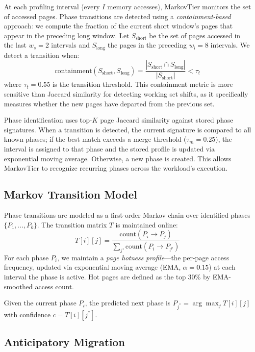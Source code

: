 \documentclass[preprint]{article}
\begin{document}
At each profiling interval (every $I$ memory accesses), MarkovTier monitors the set of accessed pages. Phase transitions are detected using a \emph{containment-based} approach: we compute the fraction of the current short window's pages that appear in the preceding long window. Let $S_\text{short}$ be the set of pages accessed in the last $w_s = 2$ intervals and $S_\text{long}$ the pages in the preceding $w_l = 8$ intervals. We detect a transition when:
\begin{equation}
    \text{containment}(S_\text{short}, S_\text{long}) = \frac{|S_\text{short} \cap S_\text{long}|}{|S_\text{short}|} < \tau_t
\end{equation}
where $\tau_t = 0.55$ is the transition threshold. This containment metric is more sensitive than Jaccard similarity for detecting working set shifts, as it specifically measures whether the new pages have departed from the previous set.

Phase identification uses top-$K$ page Jaccard similarity against stored phase signatures. When a transition is detected, the current signature is compared to all known phases; if the best match exceeds a merge threshold ($\tau_m = 0.25$), the interval is assigned to that phase and the stored profile is updated via exponential moving average. Otherwise, a new phase is created. This allows MarkovTier to recognize recurring phases across the workload's execution.

\subsection{Markov Transition Model}
\label{sec:markov}

Phase transitions are modeled as a first-order Markov chain over identified phases $\{P_1, \ldots, P_k\}$. The transition matrix $T$ is maintained online:
\begin{equation}
    T[i][j] = \frac{\text{count}(P_i \to P_j)}{\sum_{j'} \text{count}(P_i \to P_{j'})}
\end{equation}
For each phase $P_i$, we maintain a \emph{page hotness profile}---the per-page access frequency, updated via exponential moving average (EMA, $\alpha = 0.15$) at each interval the phase is active. Hot pages are defined as the top 30\% by EMA-smoothed access count.

Given the current phase $P_i$, the predicted next phase is $P_{j^*} = \arg\max_j T[i][j]$ with confidence $c = T[i][j^*]$.

\subsection{Anticipatory Migration}
\label{sec:anticipatory}
\end{document}
